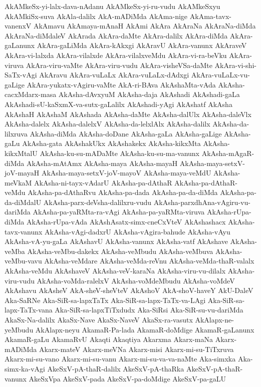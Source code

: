 {AkAMkeSx-yi-lalx-dava-nAdanu
AkAMkeSx-yi-ru-vudu
AkAMkeSxyu
AkAMkiSx-suva
AkAla-dalilx
AkA-mADiMda
AkAma-nige
AkAma-tavx-vanenxV
AkAmavu
AkAmaya-mAnaH
AkAmi
AkAra
AkAraNa
AkAraNa-diMda
AkAraNa-diMdaleV
AkArada
AkAra-daMte
AkAra-dalilx
AkAra-diMda
AkAra-gaLanunx
AkAra-gaLiMda
AkAra-kAkxgi
AkAravU
AkAra-vanunx
AkAraveV
AkAra-vi-lalxda
AkAra-vilalxde
AkAra-vilalxveMdu
AkAra-vi-ra-beVku
AkAra-viruva
AkAra-viru-vaMte
AkAra-viru-vudu
AkAra-visheVSa-daMte
AkAra-vi-shi-SaTx-vAgi
AkAravu
AkAra-vuLaLx
AkAra-vuLaLx-dAdxgi
AkAra-vuLaLx-vu-gaLige
AkAra-yukatx-vAgiru-vaMte
AkA-ri-BAva
AkAshaMta-vAda
AkAsha-cacxMdarx-masa
AkAsha-dAvxyuM
AkAsha-daja
AkAshadi
AkAshadi-gaLa
AkAshadi-sU-kaSxmX-va-sutx-gaLalilx
AkAshadi-yAgi
AkAshatf
AkAsha
AkAshaH
AkAshaM
AkAshada
AkAsha-daMte
AkAsha-dalUlx
AkAsha-daleVlx
AkAsha-dalelx
AkAsha-dalelxV
AkAsha-da-lelxlAlx
AkAsha-dalilx
AkAsha-da-lilxruva
AkAsha-diMda
AkAsha-doDane
AkAsha-gaLa
AkAsha-gaLige
AkAsha-gaLu
AkAsha-gata
AkAshakUkx
AkAshakekx
AkAsha-kikxMta
AkAsha-kikxMtalU
AkAsha-ku-su-mADaMte
AkAsha-ku-su-ma-vanunx
AkAsha-mAgaR-diMda
AkAsha-mAtAmx
AkAsha-maya
AkAsha-mayaH
AkAsha-maya-setxV-joV-mayaH
AkAsha-maya-setxV-joV-mayoV
AkAsha-maya-veMdU
AkAsha-meVkaM
AkAsha-ni-tayx-vAdarU
AkAsha-pa-dAthaR
AkAsha-pa-dAthaR-veMdu
AkAsha-pa-dAthaRvu
AkAsha-pa-dada
AkAsha-pa-da-diMda
AkAsha-pa-da-diMdalU
AkAsha-parx-deVsha-dalilxru-vudu
AkAsha-parxdhAna-vAgiru-vu-dariMda
AkAsha-pa-yaRMta-ra-vAgi
AkAsha-pa-yaRMta-viruva
AkAsha-rUpa-diMda
AkAsha-rUpa-vAda
AkAshAsatx-simx-cneCxVteV
AkAshashacx
AkAsha-tavx-vanunx
AkAsha-vAgi-dadxrU
AkAsha-vAgira-bahude
AkAsha-vAyu
AkAsha-vA-yu-gaLa
AkAshavU
AkAsha-vanunx
AkAsha-vatf
AkAshave
AkAsha-veMba
AkAsha-veMbu-dakekx
AkAsha-veMbudu
AkAsha-veMbuva
AkAsha-veMbu-vavu
AkAsha-veMdare
AkAsha-veMda-reVnu
AkAsha-veMda-thaR-valalx
AkAsha-veMdu
AkAshaveV
AkAsha-veV-karaNa
AkAsha-viru-vu-dilalx
AkAsha-viru-vudu
AkAsha-voMda-ralelxV
AkAsha-voMdeMbudu
AkAsha-voMdeV
AkAshavu
AkAsheV
AkA-sheV-sheVteV
AkAshoV
AkA-shoV-haveY
AkU-DaleV
Aka-SaRNe
Aka-SiR-sa-lapxTaTx
Aka-SiR-sa-lapx-TaTx-va-LAgi
Aka-SiR-sa-lapx-TaTx-vana
Aka-SiR-sa-lapxTiTxdudx
Aka-SiRsi
Aka-SiR-su-vu-dariMda
AkaSx-Na-dalilx
AkaSx-Nave
AkaSx-NaveV
AkaSx-ra-vasutx
AkAlapx-ne-yeMbudu
AkAlapx-neyu
AkamaR-Pa-lada
AkamaR-doMdige
AkamaR-gaLanunx
AkamaR-gaLu
AkamaRvU
Akaqti
Akaqtiya
Akarxma
Akarx-maNa
Akarx-mADiMda
Akarx-mateV
Akarx-meVNa
Akarx-misi
Akarx-mi-su-TiTxruva
Akarx-mi-su-vano
Akarx-mi-su-vanu
Akarx-mi-su-va-va-naMte
Aka-simxka
Aka-simx-ka-vAgi
AkeSxV-pA-thaR-dalilx
AkeSxV-pA-thaRka
AkeSxV-pA-thaR-vanunx
AkeSxVpa
AkeSxV-pada
AkeSxV-pa-doMdige
AkeSxV-pa-gaLU
}
